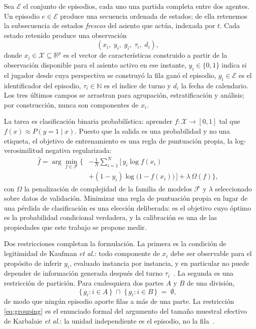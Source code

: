 \documentclass[conference]{IEEEtran}
\begin{document}
Sea $\mathcal{E}$ el conjunto de episodios, cada uno una partida completa
entre dos agentes. Un episodio $e \in \mathcal{E}$ produce una secuencia
ordenada de estados; de ella retenemos la subsecuencia de estados
\emph{frescos} del asiento que act\'ua, indexada por $t$. Cada estado
retenido produce una observaci\'on
\[
  (x_i,\; y_i,\; g_i,\; \tau_i,\; d_i),
\]
donde $x_i \in \mathcal{X} \subseteq \mathbb{R}^p$ es el vector de
caracter\'isticas construido a partir de la observaci\'on disponible para el
asiento activo en ese instante, $y_i \in \{0,1\}$ indica si el jugador desde
cuya perspectiva se construy\'o la fila gan\'o el episodio, $g_i \in
\mathcal{E}$ es el identificador del episodio, $\tau_i \in \mathbb{N}$ es el
\'indice de turno y $d_i$ la fecha de calendario. Los tres \'ultimos campos
se arrastran para agrupaci\'on, estratificaci\'on y an\'alisis; por
construcci\'on, nunca son componentes de $x_i$.

La tarea es clasificaci\'on binaria probabil\'istica: aprender
$f: \mathcal{X} \rightarrow [0,1]$ tal que $f(x) \approx P(y = 1 \mid x)$.
Puesto que la salida es una probabilidad y no una etiqueta, el objetivo de
entrenamiento es una regla de puntuaci\'on propia, la
log-verosimilitud negativa regularizada:
\begin{equation}
\label{eq:objective}
\begin{split}
\hat{f} = \arg\min_{f \in \mathcal{F}} \Big\{
  &-\frac{1}{N}\sum_{i=1}^{N}\big[\, y_i \log f(x_i)\\
  &+ (1-y_i)\log\big(1-f(x_i)\big) \,\big]
  + \lambda\,\Omega(f) \Big\},
\end{split}
\end{equation}
con $\Omega$ la penalizaci\'on de complejidad de la familia de modelos
$\mathcal{F}$ y $\lambda$ seleccionado sobre datos de validaci\'on.
Minimizar una regla de puntuaci\'on propia en lugar de una p\'erdida de
clasificaci\'on es una elecci\'on deliberada: es el objetivo cuyo \'optimo
es la probabilidad condicional verdadera, y la calibraci\'on es una de las
propiedades que este trabajo se propone medir.

Dos restricciones completan la formulaci\'on. La primera es la condici\'on
de legitimidad de Kaufman \textit{et al.}: todo componente de $x_i$ debe ser
observable para el prop\'osito de inferir $y_i$, evaluado instancia por
instancia, y en particular no puede depender de informaci\'on generada
despu\'es del turno $\tau_i$~\cite{kaufman_leakage_2011}. La segunda es una
restricci\'on de partici\'on. Para cualesquiera dos partes $A$ y $B$ de una
divisi\'on,
\begin{equation}
\label{eq:grouping}
  \{\, g_i : i \in A \,\} \;\cap\; \{\, g_i : i \in B \,\} \;=\; \emptyset ,
\end{equation}
de modo que ning\'un episodio aporte filas a m\'as de una parte. La
restricci\'on \eqref{eq:grouping} es el enunciado formal del argumento del
tama\~no muestral efectivo de Karbalaie \textit{et al.}: la unidad
independiente es el episodio, no la
fila~\cite{karbalaie_participantaware_2026}.
\end{document}

